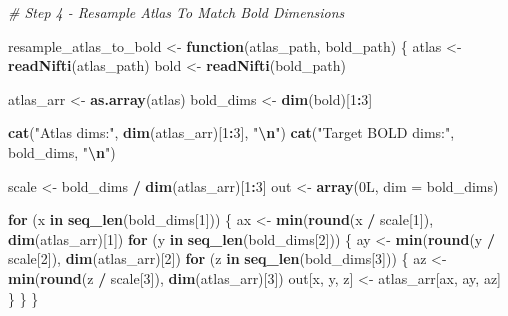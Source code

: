 \documentclass[
]{article}
\newenvironment{Shaded}{\begin{snugshade}}{\end{snugshade}}
\newcommand{\AttributeTok}[1]{\textcolor[rgb]{0.13,0.29,0.53}{#1}}
\newcommand{\CommentTok}[1]{\textcolor[rgb]{0.56,0.35,0.01}{\textit{#1}}}
\newcommand{\ControlFlowTok}[1]{\textcolor[rgb]{0.13,0.29,0.53}{\textbf{#1}}}
\newcommand{\DataTypeTok}[1]{\textcolor[rgb]{0.13,0.29,0.53}{#1}}
\newcommand{\DecValTok}[1]{\textcolor[rgb]{0.00,0.00,0.81}{#1}}
\newcommand{\FunctionTok}[1]{\textcolor[rgb]{0.13,0.29,0.53}{\textbf{#1}}}
\newcommand{\NormalTok}[1]{#1}
\newcommand{\OtherTok}[1]{\textcolor[rgb]{0.56,0.35,0.01}{#1}}
\newcommand{\SpecialCharTok}[1]{\textcolor[rgb]{0.81,0.36,0.00}{\textbf{#1}}}
\newcommand{\StringTok}[1]{\textcolor[rgb]{0.31,0.60,0.02}{#1}}
\begin{document}
\begin{Shaded}
\begin{Highlighting}[]
\CommentTok{\# Step 4 {-} Resample Atlas To Match Bold Dimensions}

\NormalTok{resample\_atlas\_to\_bold }\OtherTok{\textless{}{-}} \ControlFlowTok{function}\NormalTok{(atlas\_path, bold\_path) \{}
\NormalTok{  atlas }\OtherTok{\textless{}{-}} \FunctionTok{readNifti}\NormalTok{(atlas\_path)}
\NormalTok{  bold  }\OtherTok{\textless{}{-}} \FunctionTok{readNifti}\NormalTok{(bold\_path)}

\NormalTok{  atlas\_arr }\OtherTok{\textless{}{-}} \FunctionTok{as.array}\NormalTok{(atlas)}
\NormalTok{  bold\_dims }\OtherTok{\textless{}{-}} \FunctionTok{dim}\NormalTok{(bold)[}\DecValTok{1}\SpecialCharTok{:}\DecValTok{3}\NormalTok{]}

  \FunctionTok{cat}\NormalTok{(}\StringTok{"Atlas dims:"}\NormalTok{, }\FunctionTok{dim}\NormalTok{(atlas\_arr)[}\DecValTok{1}\SpecialCharTok{:}\DecValTok{3}\NormalTok{], }\StringTok{"}\SpecialCharTok{\textbackslash{}n}\StringTok{"}\NormalTok{)}
  \FunctionTok{cat}\NormalTok{(}\StringTok{"Target BOLD dims:"}\NormalTok{, bold\_dims, }\StringTok{"}\SpecialCharTok{\textbackslash{}n}\StringTok{"}\NormalTok{)}

\NormalTok{  scale }\OtherTok{\textless{}{-}}\NormalTok{ bold\_dims }\SpecialCharTok{/} \FunctionTok{dim}\NormalTok{(atlas\_arr)[}\DecValTok{1}\SpecialCharTok{:}\DecValTok{3}\NormalTok{]}
\NormalTok{  out   }\OtherTok{\textless{}{-}} \FunctionTok{array}\NormalTok{(}\DecValTok{0}\DataTypeTok{L}\NormalTok{, }\AttributeTok{dim =}\NormalTok{ bold\_dims)}

  \ControlFlowTok{for}\NormalTok{ (x }\ControlFlowTok{in} \FunctionTok{seq\_len}\NormalTok{(bold\_dims[}\DecValTok{1}\NormalTok{])) \{}
\NormalTok{    ax }\OtherTok{\textless{}{-}} \FunctionTok{min}\NormalTok{(}\FunctionTok{round}\NormalTok{(x }\SpecialCharTok{/}\NormalTok{ scale[}\DecValTok{1}\NormalTok{]), }\FunctionTok{dim}\NormalTok{(atlas\_arr)[}\DecValTok{1}\NormalTok{])}
    \ControlFlowTok{for}\NormalTok{ (y }\ControlFlowTok{in} \FunctionTok{seq\_len}\NormalTok{(bold\_dims[}\DecValTok{2}\NormalTok{])) \{}
\NormalTok{      ay }\OtherTok{\textless{}{-}} \FunctionTok{min}\NormalTok{(}\FunctionTok{round}\NormalTok{(y }\SpecialCharTok{/}\NormalTok{ scale[}\DecValTok{2}\NormalTok{]), }\FunctionTok{dim}\NormalTok{(atlas\_arr)[}\DecValTok{2}\NormalTok{])}
      \ControlFlowTok{for}\NormalTok{ (z }\ControlFlowTok{in} \FunctionTok{seq\_len}\NormalTok{(bold\_dims[}\DecValTok{3}\NormalTok{])) \{}
\NormalTok{        az           }\OtherTok{\textless{}{-}} \FunctionTok{min}\NormalTok{(}\FunctionTok{round}\NormalTok{(z }\SpecialCharTok{/}\NormalTok{ scale[}\DecValTok{3}\NormalTok{]), }\FunctionTok{dim}\NormalTok{(atlas\_arr)[}\DecValTok{3}\NormalTok{])}
\NormalTok{        out[x, y, z] }\OtherTok{\textless{}{-}}\NormalTok{ atlas\_arr[ax, ay, az]}
\NormalTok{      \}}
\NormalTok{    \}}
\NormalTok{  \}}


\end{Highlighting}
\end{Shaded}
\end{document}
